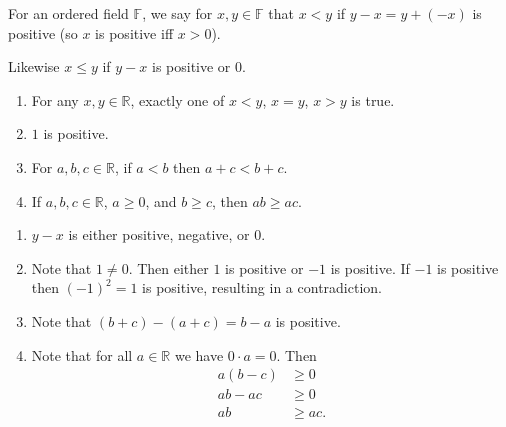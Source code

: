 \documentclass{notes}
\begin{document}
\newpage

\underline{}

\begin{defn}
  For an ordered field $\mathbb F$, we say for $x, y \in \mathbb F$ that $x < y$ if $y - x = y + (-x)$ is positive (so $x$ is positive iff $x > 0$).

  Likewise $x \leq y$ if $y - x$ is positive or $0$.
\end{defn}

\begin{lem}
  \begin{enumerate}
    \item For any $x, y \in \mathbb R$, exactly one of $x < y$, $x = y$, $x > y$ is true.

    \item $1$ is positive.

    \item For $a, b, c \in \mathbb R$, if $a < b$ then $a + c < b + c$.

    \item If $a, b, c \in \mathbb R$, $a \geq 0$, and $b \geq c$, then $a b \geq a c$.
  \end{enumerate}
\end{lem}

\begin{prf}
  \begin{enumerate}
    \item $y - x$ is either positive, negative, or $0$.

    \item Note that $1 \neq 0$.
    Then either $1$ is positive or $-1$ is positive.
    If $-1$ is positive then $(-1)^2 = 1$ is positive, resulting in a contradiction.

    \item Note that $(b + c) - (a + c) = b - a$ is positive.

    \item Note that for all $a \in \mathbb R$ we have $0 \cdot a = 0$.
    Then 
    \begin{align*}
      a (b - c) &\geq 0 \\ 
      a b - a c &\geq 0 \\ 
      a b &\geq a c.
    \end{align*}
  \end{enumerate}
\end{prf}

\underline{}
\end{document}
